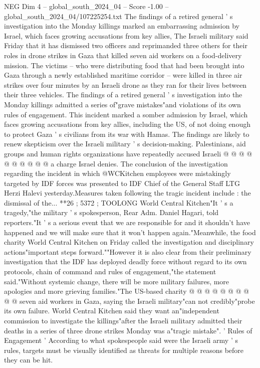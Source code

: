 \begin{textsample}{NEG Dim 4 – global\_south\_2024\_04 – Score -1.00 – global\_south\_2024\_04/107225254.txt}  \label{ex:f4_neg_192}
The findings of a retired general ' s investigation into the Monday killings marked an embarrassing admission by Israel, which faces growing accusations from key allies, The Israeli military said Friday that it has dismissed two officers and reprimanded three others for their roles in drone strikes in Gaza that killed seven aid workers on a food-delivery mission.
The victims -- who were distributing food that had been brought into Gaza through a newly established maritime corridor -- were killed in three air strikes over four minutes by an Israeli drone as they ran for their lives between their three vehicles.
The findings of a retired general ' s investigation into the Monday killings admitted a series of"grave mistakes"and violations of its own rules of engagement.
This incident marked a somber admission by Israel, which faces growing accusations from key allies, including the US, of not doing enough to protect Gaza ' s civilians from its war with Hamas.
The findings are likely to renew skepticism over the Israeli military ' s decision-making.
Palestinians, aid groups and human rights organizations have repeatedly accused Israeli @ @ @ @ @ @ @ @ @ @ a charge Israel denies.
The conclusion of the investigation regarding the incident in which @WCKitchen employees were mistakingly targeted by IDF forces was presented to IDF Chief of the General Staff LTG Herzi Halevi yesterday.Measures taken following the tragic incident include : the dismissal of the... **26 ; 5372 ; TOOLONG World Central Kitchen"It ' s a tragedy,"the military ' s spokesperson, Rear Adm.
Daniel Hagari, told reporters."It ' s a serious event that we are responsible for and it shouldn't have happened and we will make sure that it won't happen again."Meanwhile, the food charity World Central Kitchen on Friday called the investigation and disciplinary actions"important steps forward.""However it is also clear from their preliminary investigation that the IDF has deployed deadly force without regard to its own protocols, chain of command and rules of engagement,"the statement said."Without systemic change, there will be more military failures, more apologies and more grieving families."The US-based charity @ @ @ @ @ @ @ @ @ @ seven aid workers in Gaza, saying the Israeli military"can not credibly"probe its own failure.
World Central Kitchen said they want an"independent commission to investigate the killings"after the Israeli military admitted their deaths in a series of three drone strikes Monday was a"tragic mistake". ' Rules of Engagement ' According to what spokespeople said were the Israeli army ' s rules, targets must be visually identified as threats for multiple reasons before they can be hit.

\end{textsample}
